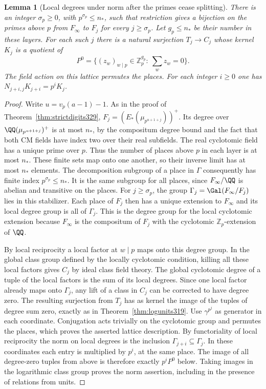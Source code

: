 \documentclass[a4paper,11pt]{article}
\newtheorem{lemma}[proposition]{Lemma}
\theoremstyle{definition}
\theoremstyle{remark}
\newcommand{\ZZ}{\mathbb Z}\newcommand{\ord}{\operatorname{ord}}
\numberwithin{equation}{section}
\begin{document}
\begin{lemma}[Local degrees under norm after the primes cease splitting]
\leavevmode\label{lem:locnorm514}
There is an integer \(\sigma_p\ge0\), with \(p^{\sigma_p}\le n_*\),
such that restriction gives a bijection on the primes above
\(p\) from \(F_\infty\) to \(F_j\) for every \(j\ge\sigma_p\).
Let \(g_p\le n_*\) be their number in these layers. For each such
\(j\) there is a natural surjection \(T_j\to C_j\) whose kernel
\(K_j\) is a quotient of
\[
 P^0=\{(z_w)_{w\mid p}\in\ZZ_p^{g_p}:\ \sum_w z_w=0\}.
\]
The field action on this lattice permutes the places. For each
integer \(i\ge0\) one has \(N_{j+i,j}K_{j+i}=p^iK_j\).
\end{lemma}
\begin{proof}
Write \(u=v_p(a-1)-1\). As in the proof of
Theorem~\ref{thm:strictdigits329},
\(F_j=(E_*(\mu_{p^{u+1+j}}))^+\). Its degree over
\(\QQ(\mu_{p^{u+1+j}})^+\) is at most \(n_*\), by the compositum
degree bound and the fact that both CM fields have index two over
their real subfields. The real cyclotomic field has a unique prime
over \(p\). Thus the number of places above \(p\) in each layer is
at most \(n_*\). These finite sets map onto one another, so their
inverse limit has at most \(n_*\) elements. The decomposition
subgroup of a place in \(\Gamma\) consequently has finite index
\(p^{\sigma_p}\le n_*\). It is the same subgroup for all places,
since \(F_\infty/\QQ\) is abelian and transitive on the places.
For \(j\ge\sigma_p\), the group \(\Gamma_j=\Gal(F_\infty/F_j)\)
lies in this stabilizer. Each place of \(F_j\) then has a unique
extension to \(F_\infty\) and its local degree group is all of
\(\Gamma_j\). This is the degree group for the local cyclotomic
extension because \(F_\infty\) is the compositum of \(F_j\) with the
cyclotomic \(\ZZ_p\)-extension of \(\QQ\).

By local reciprocity a local factor at \(w\mid p\) maps onto this
degree group. In the global class group defined by the locally
cyclotomic condition, killing all these local factors gives \(C_j\)
by ideal class field theory. The global cyclotomic degree of a
tuple of the local factors is the sum of its local degrees. Since
one local factor already maps onto \(\Gamma_j\), any lift of a
class in \(C_j\) can be corrected to have degree zero. The resulting
surjection from \(T_j\) has as kernel the image of the tuples of
degree sum zero, exactly as in Theorem~\ref{thm:logunits319}.
Use \(\gamma^{p^j}\) as generator in each coordinate. Conjugation
acts trivially on the cyclotomic group and permutes the places,
which proves the asserted lattice description. By functoriality
of local reciprocity the norm on local degrees is the inclusion
\(\Gamma_{j+i}\subseteq\Gamma_j\). In these coordinates each entry
is multiplied by \(p^i\), at the same place. The image of all
degree-zero tuples from above is therefore exactly \(p^iP^0\)
below. Taking images in the logarithmic class group proves the
norm assertion, including in the presence of relations from units.
\end{proof}
\end{document}
